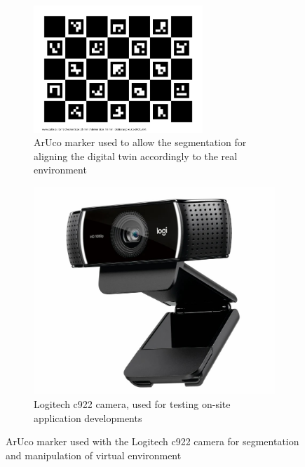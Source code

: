     \begin{figure}[h]
        \centering
        \begin{subfigure}[b]{0.45\textwidth}
        \centering
        \includegraphics[width=0.7\textwidth]{figs/calib_io_charuco_200x150_5x7_25_18_DICT_4X4.png}
        \caption{ArUco marker used to allow the segmentation for aligning the digital twin accordingly to the real environment}
        \label{f:aruco_marker}
        \end{subfigure}
            \hfill %
        \begin{subfigure}[b]{0.45\textwidth}
            \centering
            \includegraphics[width=0.7\linewidth]{figs/camera-c922.jpg}
            \caption{Logitech c922 camera, used for testing on-site application developments}
            \label{fig:camera-c922}
        \end{subfigure}
        \caption{ArUco marker used with the Logitech c922 camera for segmentation and manipulation of virtual environment}
    \label{marker-camera}
    \end{figure}
    

